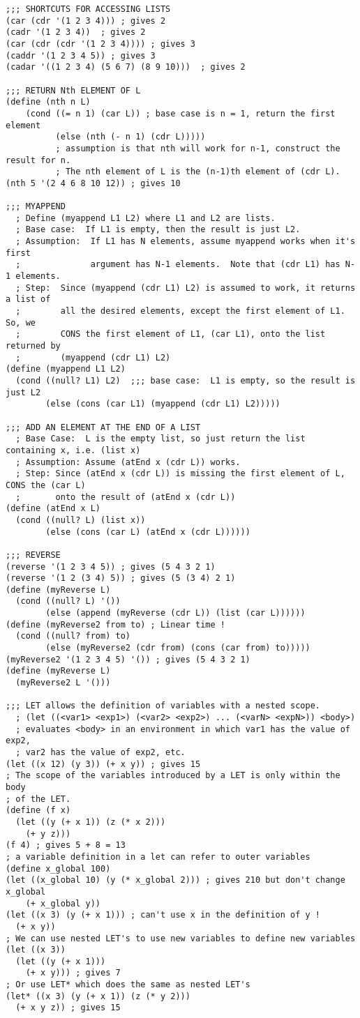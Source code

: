 \documentclass[20pt]{article}
\begin{document}
\begin{verbatim}
;;; SHORTCUTS FOR ACCESSING LISTS
(car (cdr '(1 2 3 4))) ; gives 2
(cadr '(1 2 3 4))  ; gives 2
(car (cdr (cdr '(1 2 3 4)))) ; gives 3
(caddr '(1 2 3 4 5)) ; gives 3
(cadar '((1 2 3 4) (5 6 7) (8 9 10)))  ; gives 2

;;; RETURN Nth ELEMENT OF L
(define (nth n L)
    (cond ((= n 1) (car L)) ; base case is n = 1, return the first element
          (else (nth (- n 1) (cdr L))))) 
          ; assumption is that nth will work for n-1, construct the result for n. 
          ; The nth element of L is the (n-1)th element of (cdr L).
(nth 5 '(2 4 6 8 10 12)) ; gives 10

;;; MYAPPEND
  ; Define (myappend L1 L2) where L1 and L2 are lists.
  ; Base case:  If L1 is empty, then the result is just L2.
  ; Assumption:  If L1 has N elements, assume myappend works when it's first
  ;              argument has N-1 elements.  Note that (cdr L1) has N-1 elements.
  ; Step:  Since (myappend (cdr L1) L2) is assumed to work, it returns a list of
  ;        all the desired elements, except the first element of L1. So, we
  ;        CONS the first element of L1, (car L1), onto the list returned by
  ;        (myappend (cdr L1) L2)
(define (myappend L1 L2)  
  (cond ((null? L1) L2)  ;;; base case:  L1 is empty, so the result is just L2
        (else (cons (car L1) (myappend (cdr L1) L2)))))   

;;; ADD AN ELEMENT AT THE END OF A LIST
  ; Base Case:  L is the empty list, so just return the list containing x, i.e. (list x)
  ; Assumption: Assume (atEnd x (cdr L)) works.
  ; Step: Since (atEnd x (cdr L)) is missing the first element of L, CONS the (car L)
  ;       onto the result of (atEnd x (cdr L))
(define (atEnd x L) 
  (cond ((null? L) (list x))  
        (else (cons (car L) (atEnd x (cdr L))))))

;;; REVERSE
(reverse '(1 2 3 4 5)) ; gives (5 4 3 2 1)
(reverse '(1 2 (3 4) 5)) ; gives (5 (3 4) 2 1)
(define (myReverse L)
  (cond ((null? L) '())
        (else (append (myReverse (cdr L)) (list (car L))))))
(define (myReverse2 from to) ; Linear time !
  (cond ((null? from) to)
        (else (myReverse2 (cdr from) (cons (car from) to)))))
(myReverse2 '(1 2 3 4 5) '()) ; gives (5 4 3 2 1)
(define (myReverse L)
  (myReverse2 L '()))

;;; LET allows the definition of variables with a nested scope.
  ; (let ((<var1> <exp1>) (<var2> <exp2>) ... (<varN> <expN>)) <body>)
  ; evaluates <body> in an environment in which var1 has the value of exp2,
  ; var2 has the value of exp2, etc.
(let ((x 12) (y 3)) (+ x y)) ; gives 15
; The scope of the variables introduced by a LET is only within the body 
; of the LET.
(define (f x)
  (let ((y (+ x 1)) (z (* x 2)))
    (+ y z)))
(f 4) ; gives 5 + 8 = 13
; a variable definition in a let can refer to outer variables
(define x_global 100)
(let ((x_global 10) (y (* x_global 2))) ; gives 210 but don't change x_global
    (+ x_global y))
(let ((x 3) (y (+ x 1))) ; can't use x in the definition of y !
  (+ x y))
; We can use nested LET's to use new variables to define new variables
(let ((x 3))
  (let ((y (+ x 1)))
    (+ x y))) ; gives 7
; Or use LET* which does the same as nested LET's
(let* ((x 3) (y (+ x 1)) (z (* y 2)))
  (+ x y z)) ; gives 15


\end{verbatim}
\end{document}
